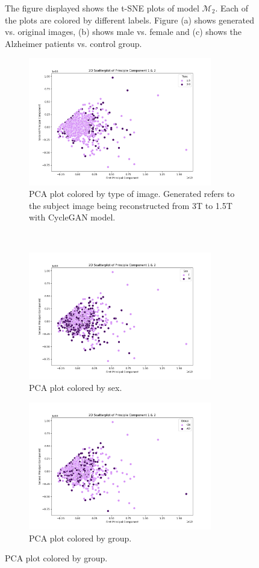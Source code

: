 \documentclass[11pt, fleqn, titlepage]{article}
\newcommand{\1}[1]{\mathds{1}\left[#1\right]}
\begin{document}
\begin{figure}[H]
	\caption{The figure displayed shows the t-SNE plots of model $ \mathcal M_2 $. Each of the plots are colored by different labels. Figure (a) shows generated vs. original images, (b) shows male vs. female and (c) shows the Alzheimer patients vs. control group. }
	\label{fig:tsne_not_gen_overfit}
\end{figure}


\begin{figure}[H]
	\centering
	\begin{subfigure}[t]{0.59\textwidth}
		\centering
		\includegraphics[height=2.2in]{imgs/classifier/overfit_not_generated_imgs_all_datapca_type}%
		\caption{PCA plot colored by type of image. Generated refers to the subject image being reconstructed from 3T to 1.5T with CycleGAN model.}
	\end{subfigure}%
	~
	\begin{subfigure}[t]{0.5\textwidth}
		\centering
		\includegraphics[height=2.2in]{imgs/classifier/overfit_not_generated_imgs_all_datapca_sex}%
		\caption{PCA plot colored by sex.}	
	\end{subfigure}
	\begin{subfigure}[t]{0.5\textwidth}
		\centering
		\includegraphics[height=2.2in]{imgs/classifier/overfit_not_generated_imgs_all_datapca_group}%
		\caption{PCA plot colored by group.}
	\end{subfigure}
	

\end{figure}
\end{document}
